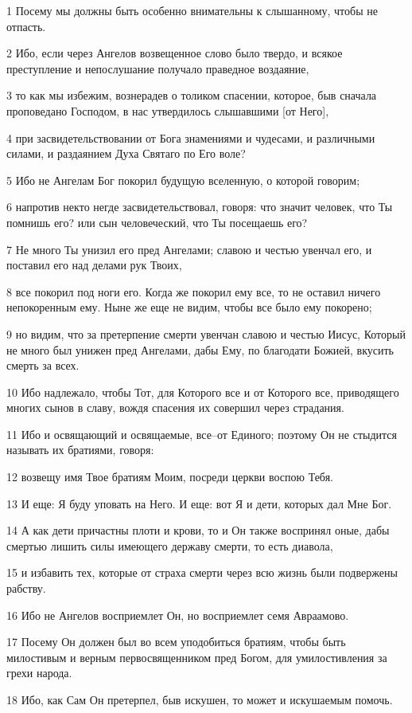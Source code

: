 \par 1 Посему мы должны быть особенно внимательны к слышанному, чтобы не отпасть.
\par 2 Ибо, если через Ангелов возвещенное слово было твердо, и всякое преступление и непослушание получало праведное воздаяние,
\par 3 то как мы избежим, вознерадев о толиком спасении, которое, быв сначала проповедано Господом, в нас утвердилось слышавшими [от Него],
\par 4 при засвидетельствовании от Бога знамениями и чудесами, и различными силами, и раздаянием Духа Святаго по Его воле?
\par 5 Ибо не Ангелам Бог покорил будущую вселенную, о которой говорим;
\par 6 напротив некто негде засвидетельствовал, говоря: что значит человек, что Ты помнишь его? или сын человеческий, что Ты посещаешь его?
\par 7 Не много Ты унизил его пред Ангелами; славою и честью увенчал его, и поставил его над делами рук Твоих,
\par 8 все покорил под ноги его. Когда же покорил ему все, то не оставил ничего непокоренным ему. Ныне же еще не видим, чтобы все было ему покорено;
\par 9 но видим, что за претерпение смерти увенчан славою и честью Иисус, Который не много был унижен пред Ангелами, дабы Ему, по благодати Божией, вкусить смерть за всех.
\par 10 Ибо надлежало, чтобы Тот, для Которого все и от Которого все, приводящего многих сынов в славу, вождя спасения их совершил через страдания.
\par 11 Ибо и освящающий и освящаемые, все--от Единого; поэтому Он не стыдится называть их братиями, говоря:
\par 12 возвещу имя Твое братиям Моим, посреди церкви воспою Тебя.
\par 13 И еще: Я буду уповать на Него. И еще: вот Я и дети, которых дал Мне Бог.
\par 14 А как дети причастны плоти и крови, то и Он также воспринял оные, дабы смертью лишить силы имеющего державу смерти, то есть диавола,
\par 15 и избавить тех, которые от страха смерти через всю жизнь были подвержены рабству.
\par 16 Ибо не Ангелов восприемлет Он, но восприемлет семя Авраамово.
\par 17 Посему Он должен был во всем уподобиться братиям, чтобы быть милостивым и верным первосвященником пред Богом, для умилостивления за грехи народа.
\par 18 Ибо, как Сам Он претерпел, быв искушен, то может и искушаемым помочь.


